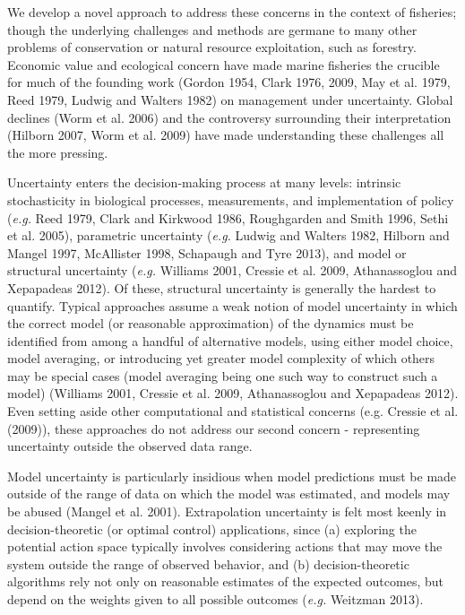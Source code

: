 \documentclass[]{components/elsarticle}
\begin{document}
We develop a novel approach to address these concerns in the context of
fisheries; though the underlying challenges and methods are germane to
many other problems of conservation or natural resource exploitation,
such as forestry. Economic value and ecological concern have made marine
fisheries the crucible for much of the founding work (Gordon 1954, Clark
1976, 2009, May et al. 1979, Reed 1979, Ludwig and Walters 1982) on
management under uncertainty. Global declines (Worm et al. 2006) and the
controversy surrounding their interpretation (Hilborn 2007, Worm et al.
2009) have made understanding these challenges all the more pressing.

Uncertainty enters the decision-making process at many levels: intrinsic
stochasticity in biological processes, measurements, and implementation
of policy (\emph{e.g.} Reed 1979, Clark and Kirkwood 1986, Roughgarden
and Smith 1996, Sethi et al. 2005), parametric uncertainty (\emph{e.g.}
Ludwig and Walters 1982, Hilborn and Mangel 1997, McAllister 1998,
Schapaugh and Tyre 2013), and model or structural uncertainty
(\emph{e.g.} Williams 2001, Cressie et al. 2009, Athanassoglou and
Xepapadeas 2012). Of these, structural uncertainty is generally the
hardest to quantify. Typical approaches assume a weak notion of model
uncertainty in which the correct model (or reasonable approximation) of
the dynamics must be identified from among a handful of alternative
models, using either model choice, model averaging, or introducing yet
greater model complexity of which others may be special cases (model
averaging being one such way to construct such a model) (Williams 2001,
Cressie et al. 2009, Athanassoglou and Xepapadeas 2012). Even setting
aside other computational and statistical concerns (e.g. Cressie et al.
(2009)), these approaches do not address our second concern -
representing uncertainty outside the observed data range.

Model uncertainty is particularly insidious when model predictions must
be made outside of the range of data on which the model was estimated,
and models may be abused (Mangel et al. 2001). Extrapolation uncertainty
is felt most keenly in decision-theoretic (or optimal control)
applications, since (a) exploring the potential action space typically
involves considering actions that may move the system outside the range
of observed behavior, and (b) decision-theoretic algorithms rely not
only on reasonable estimates of the expected outcomes, but depend on the
weights given to all possible outcomes (\emph{e.g.} Weitzman 2013).
\end{document}
